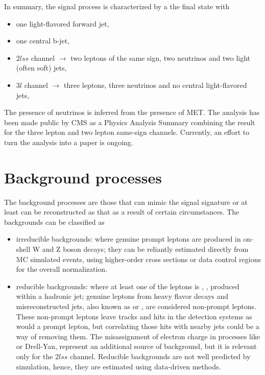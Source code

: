 In summary, the signal process is characterized by a the final state with

\begin{itemize}
\item one light-flavored forward jet,
\item one central b-jet,
\item $2lss$ channel $\to$ two leptons of the same sign, two neutrinos and two light (often soft) jets,
\item $3l$ channel $\to$ three leptons, three neutrinos and no central light-flavored jets,
\end{itemize}

The presence of neutrinos is inferred from the presence of MET. The analysis has been made public by CMS as a Physics Analysis Summary\cite{CMS_PAS_HIG_17-005} combining the result for the three lepton and two lepton same-sign channels. Currently, an effort to turn the analysis into a paper is ongoing.


\section{Background processes}\label{sec:bg}

The background processes are those that can mimic the signal signature or at least can be reconstructed as that as a result of certain circumstances. The backgrounds can be classified as

\begin{itemize}

\item irreducible backgrounds: where genuine prompt leptons are produced in on-shell W and Z boson decays; they can be reliantly estimated directly from MC simulated events, using higher-order cross sections or data control regions for the overall normalization.

\item reducible backgrounds: where at least one of the leptons is , \ie, produced within a hadronic jet; genuine leptons from heavy flavor decays and misreconstructed jets, also known as  or , are considered non-prompt leptons. These non-prompt leptons leave tracks and hits in the detection systems as would a prompt lepton, but correlating those hits with nearby jets could be a way of removing them. The misassignment of electron charge in processes like \ttbar or Drell-Yan, represent an additional source of background, but it is relevant only for the $2lss$ channel. Reducible backgrounds are not well predicted by simulation, hence, they are estimated using data-driven methods. 
\end{itemize}

